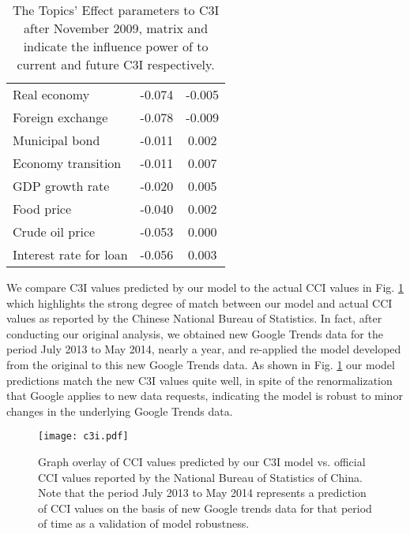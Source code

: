 \documentclass[10pt]{article}
\begin{document}
\begin {table}
\begin {center}
\begin {tabular} {lcc}
Real economy	               &	-0.074	&	-0.005	\\
Foreign exchange	       &	-0.078	&	-0.009	\\
\hline
Municipal bond	               &	-0.011	&	0.002	\\
Economy transition	       &	-0.011	&	0.007	\\
GDP growth rate	       &	-0.020	&	0.005	\\
Food price	               &	-0.040	&	0.002	\\
Crude oil price	               &	-0.053	&	0.000	\\
Interest rate for loan	       &	-0.056	&	0.003	\\

\hline
 \end {tabular}
 \caption{The Topics' Effect parameters to C3I after November 2009, matrix  and  indicate the influence power of  to current and future C3I respectively.}
 \label{matrixBC}
 \end{center}
 \end {table}    



We compare C3I values predicted by our model to the actual CCI values in Fig. \ref{evaluation} which highlights the strong degree of match between our model and actual CCI values as reported by the Chinese National Bureau of Statistics. In fact, after conducting our original analysis, we obtained new Google Trends data for the period July 2013 to May 2014, nearly a year, and re-applied the model developed from the original to this new Google Trends data. As shown in Fig. \ref{evaluation} our model predictions match the new C3I values quite well, in spite of the renormalization that Google applies to new data requests, indicating the model is robust to minor changes in the underlying Google Trends data.

\begin{figure}[h!]
	\begin{center}
	\texttt{[image: c3i.pdf]}
\caption{ \label{evaluation} Graph overlay of CCI values predicted by our C3I model vs. official CCI values reported by the National Bureau of Statistics of China. Note that the period July 2013 to May 2014 represents a prediction of CCI values on the basis of new Google trends data for that period of time as a validation of model robustness.}
	\end{center}
\end{figure}
\end{document}
